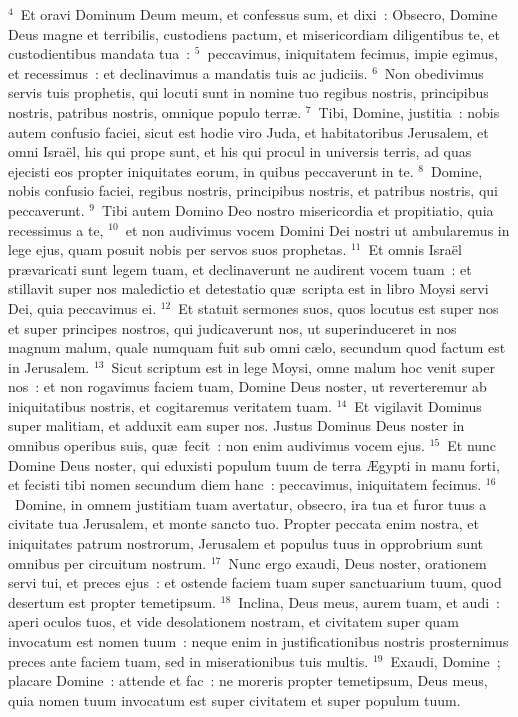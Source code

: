${}^{4}$~Et oravi Dominum Deum meum, et confessus sum, et dixi~: Obsecro, Domine Deus magne et terribilis, custodiens pactum, et misericordiam diligentibus te, et custodientibus mandata tua~:
${}^{5}$~peccavimus, iniquitatem fecimus, impie egimus, et recessimus~: et declinavimus a mandatis tuis ac judiciis.
${}^{6}$~Non obedivimus servis tuis prophetis, qui locuti sunt in nomine tuo regibus nostris, principibus nostris, patribus nostris, omnique populo terr\ae .
${}^{7}$~Tibi, Domine, justitia~: nobis autem confusio faciei, sicut est hodie viro Juda, et habitatoribus Jerusalem, et omni Isra\"el, his qui prope sunt, et his qui procul in universis terris, ad quas ejecisti eos propter iniquitates eorum, in quibus peccaverunt in te.
${}^{8}$~Domine, nobis confusio faciei, regibus nostris, principibus nostris, et patribus nostris, qui peccaverunt.
${}^{9}$~Tibi autem Domino Deo nostro misericordia et propitiatio, quia recessimus a te,
${}^{10}$~et non audivimus vocem Domini Dei nostri ut ambularemus in lege ejus, quam posuit nobis per servos suos prophetas.
${}^{11}$~Et omnis Isra\"el pr\ae varicati sunt legem tuam, et declinaverunt ne audirent vocem tuam~: et stillavit super nos maledictio et detestatio qu\ae\ scripta est in libro Moysi servi Dei, quia peccavimus ei.
${}^{12}$~Et statuit sermones suos, quos locutus est super nos et super principes nostros, qui judicaverunt nos, ut superinduceret in nos magnum malum, quale numquam fuit sub omni c\ae lo, secundum quod factum est in Jerusalem.
${}^{13}$~Sicut scriptum est in lege Moysi, omne malum hoc venit super nos~: et non rogavimus faciem tuam, Domine Deus noster, ut reverteremur ab iniquitatibus nostris, et cogitaremus veritatem tuam.
${}^{14}$~Et vigilavit Dominus super malitiam, et adduxit eam super nos. Justus Dominus Deus noster in omnibus operibus suis, qu\ae\ fecit~: non enim audivimus vocem ejus.
${}^{15}$~Et nunc Domine Deus noster, qui eduxisti populum tuum de terra \AE gypti in manu forti, et fecisti tibi nomen secundum diem hanc~: peccavimus, iniquitatem fecimus.
${}^{16}$~Domine, in omnem justitiam tuam avertatur, obsecro, ira tua et furor tuus a civitate tua Jerusalem, et monte sancto tuo. Propter peccata enim nostra, et iniquitates patrum nostrorum, Jerusalem et populus tuus in opprobrium sunt omnibus per circuitum nostrum.
${}^{17}$~Nunc ergo exaudi, Deus noster, orationem servi tui, et preces ejus~: et ostende faciem tuam super sanctuarium tuum, quod desertum est propter temetipsum.
${}^{18}$~Inclina, Deus meus, aurem tuam, et audi~: aperi oculos tuos, et vide desolationem nostram, et civitatem super quam invocatum est nomen tuum~: neque enim in justificationibus nostris prosternimus preces ante faciem tuam, sed in miserationibus tuis multis.
${}^{19}$~Exaudi, Domine~; placare Domine~: attende et fac~: ne moreris propter temetipsum, Deus meus, quia nomen tuum invocatum est super civitatem et super populum tuum.


